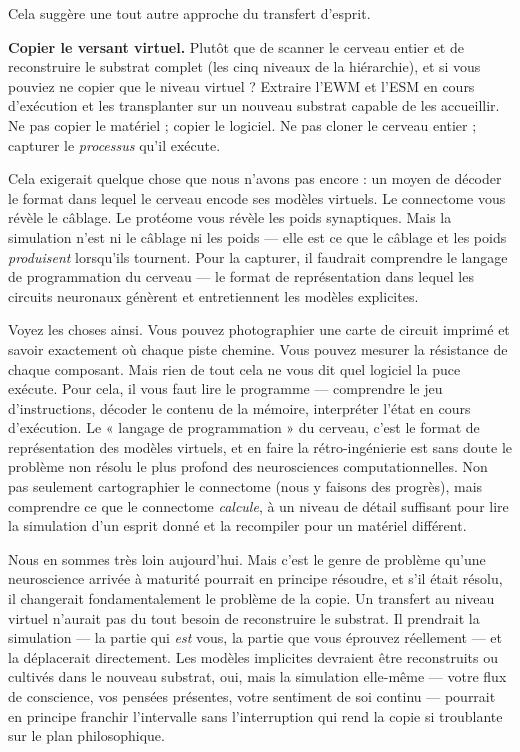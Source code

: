 \documentclass[11pt, twoside, openright]{book}
\begin{document}
Cela suggère une tout autre approche du transfert d'esprit.

\textbf{Copier le versant virtuel.} Plutôt que de scanner le cerveau entier et de reconstruire le substrat complet (les cinq niveaux de la hiérarchie), et si vous pouviez ne copier que le niveau virtuel ? Extraire l'EWM et l'ESM en cours d'exécution et les transplanter sur un nouveau substrat capable de les accueillir. Ne pas copier le matériel ; copier le logiciel. Ne pas cloner le cerveau entier ; capturer le \textit{processus} qu'il exécute.

Cela exigerait quelque chose que nous n'avons pas encore : un moyen de décoder le format dans lequel le cerveau encode ses modèles virtuels. Le connectome vous révèle le câblage. Le protéome vous révèle les poids synaptiques. Mais la simulation n'est ni le câblage ni les poids --- elle est ce que le câblage et les poids \textit{produisent} lorsqu'ils tournent. Pour la capturer, il faudrait comprendre le langage de programmation du cerveau --- le format de représentation dans lequel les circuits neuronaux génèrent et entretiennent les modèles explicites.

Voyez les choses ainsi. Vous pouvez photographier une carte de circuit imprimé et savoir exactement où chaque piste chemine. Vous pouvez mesurer la résistance de chaque composant. Mais rien de tout cela ne vous dit quel logiciel la puce exécute. Pour cela, il vous faut lire le programme --- comprendre le jeu d'instructions, décoder le contenu de la mémoire, interpréter l'état en cours d'exécution. Le « langage de programmation » du cerveau, c'est le format de représentation des modèles virtuels, et en faire la rétro-ingénierie est sans doute le problème non résolu le plus profond des neurosciences computationnelles. Non pas seulement cartographier le connectome (nous y faisons des progrès), mais comprendre ce que le connectome \textit{calcule}, à un niveau de détail suffisant pour lire la simulation d'un esprit donné et la recompiler pour un matériel différent.

Nous en sommes très loin aujourd'hui. Mais c'est le genre de problème qu'une neuroscience arrivée à maturité pourrait en principe résoudre, et s'il était résolu, il changerait fondamentalement le problème de la copie. Un transfert au niveau virtuel n'aurait pas du tout besoin de reconstruire le substrat. Il prendrait la simulation --- la partie qui \textit{est} vous, la partie que vous éprouvez réellement --- et la déplacerait directement. Les modèles implicites devraient être reconstruits ou cultivés dans le nouveau substrat, oui, mais la simulation elle-même --- votre flux de conscience, vos pensées présentes, votre sentiment de soi continu --- pourrait en principe franchir l'intervalle sans l'interruption qui rend la copie si troublante sur le plan philosophique.
\end{document}

